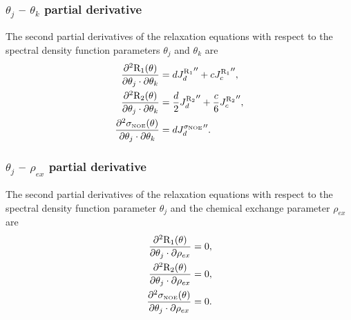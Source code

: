 \subsubsection{$\theta_j$ -- $\theta_k$ partial derivative}

The second partial derivatives of the relaxation equations with respect to the spectral density function parameters $\theta_j$ and $\theta_k$ are
\begin{subequations}
\begin{align}
    \frac{\partial^2 \mathrm{R}_1(\theta)}{\partial \theta_j \cdot \partial \theta_k} &= d {J_d^{\mathrm{R}_1}}'' + c {J_c^{\mathrm{R}_1}}'',                      \label{eq: Ri': d2R1/dmfj.dmfk} \\
    \frac{\partial^2 \mathrm{R}_2(\theta)}{\partial \theta_j \cdot \partial \theta_k} &= \frac{d}{2} {J_d^{\mathrm{R}_2}}'' + \frac{c}{6} {J_c^{\mathrm{R}_2}}'',  \label{eq: Ri': d2R2/dmfj.dmfk} \\
    \frac{\partial^2 \sigma_{\scriptscriptstyle \mathrm{NOE}}(\theta)}{\partial \theta_j \cdot \partial \theta_k} &= d {J_d^{\sigma_{\scriptscriptstyle \mathrm{NOE}}}}''.                          \label{eq: Ri': d2sigmaNOE/dmfj.dmfk}
\end{align}
\end{subequations}


\subsubsection{$\theta_j$ -- $\rho_{ex}$ partial derivative}

The second partial derivatives of the relaxation equations with respect to the spectral density function parameter $\theta_j$ and the chemical exchange parameter $\rho_{ex}$ are
\begin{subequations}
\begin{align}
    \frac{\partial^2 \mathrm{R}_1(\theta)}{\partial \theta_j \cdot \partial \rho_{ex}} &= 0,        \label{eq: Ri': d2R1/dmfj.dRex} \\
    \frac{\partial^2 \mathrm{R}_2(\theta)}{\partial \theta_j \cdot \partial \rho_{ex}} &= 0,        \label{eq: Ri': d2R2/dmfj.dRex} \\
    \frac{\partial^2 \sigma_{\scriptscriptstyle \mathrm{NOE}}(\theta)}{\partial \theta_j \cdot \partial \rho_{ex}} &= 0. \label{eq: Ri': d2sigmaNOE/dmfj.dRex}
\end{align}
\end{subequations}


